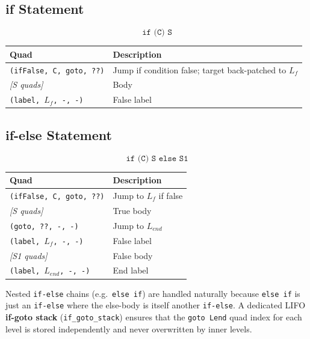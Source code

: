 \documentclass[11pt]{article}
\begin{document}
\subsection{if Statement}

\[
\texttt{if (C) S}
\]

\begin{center}
\renewcommand{\arraystretch}{1.3}
\begin{tabular}{@{}ll@{}}
\toprule
\textbf{Quad} & \textbf{Description} \\
\midrule
\texttt{(ifFalse, C, goto, ??)} & Jump if condition false; target back-patched to $L_f$ \\
\textit{[S quads]} & Body \\
\texttt{(label, $L_f$, -, -)} & False label \\
\bottomrule
\end{tabular}
\end{center}

\subsection{if-else Statement}

\[
\texttt{if (C) S else S1}
\]

\begin{center}
\renewcommand{\arraystretch}{1.3}
\begin{tabular}{@{}ll@{}}
\toprule
\textbf{Quad} & \textbf{Description} \\
\midrule
\texttt{(ifFalse, C, goto, ??)} & Jump to $L_f$ if false \\
\textit{[S quads]} & True body \\
\texttt{(goto, ??, -, -)} & Jump to $L_{end}$ \\
\texttt{(label, $L_f$, -, -)} & False label \\
\textit{[S1 quads]} & False body \\
\texttt{(label, $L_{end}$, -, -)} & End label \\
\bottomrule
\end{tabular}
\end{center}

\noindent Nested \texttt{if-else} chains (e.g.\ \texttt{else if}) are handled naturally because \texttt{else if} is just an \texttt{if-else} where the else-body is itself another \texttt{if-else}. A dedicated LIFO \textbf{if-goto stack} (\texttt{if\_goto\_stack}) ensures that the \texttt{goto Lend} quad index for each level is stored independently and never overwritten by inner levels.
\end{document}
